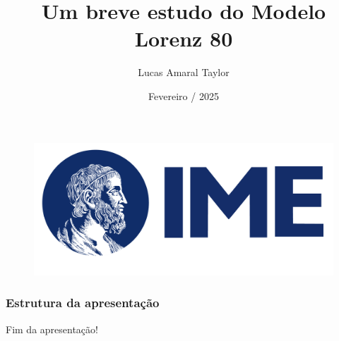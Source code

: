 \documentclass[
    11pt,               %
]{beamer}
\title[Lorenz 80]{Um breve estudo do Modelo Lorenz 80}
\author[TAYLOR, Lucas A.]{Lucas Amaral Taylor}
\institute[IME-USP]{Instituto de Matemática e Estatística \\ (IME-USP)}
\date[2025]{Fevereiro / 2025}
\begin{document}
\begin{frame}
    \begin{figure}
        \includegraphics[width=0.45\linewidth]{img/logo_IME.png}
    \end{figure}
    \titlepage
\end{frame}

\begin{frame}
    \frametitle{Estrutura da apresentação}
    \tableofcontents
\end{frame}






\begin{frame}
    \begin{center}
        {\Huge Fim da apresentação!}
    \end{center}
\end{frame}
\end{document}
